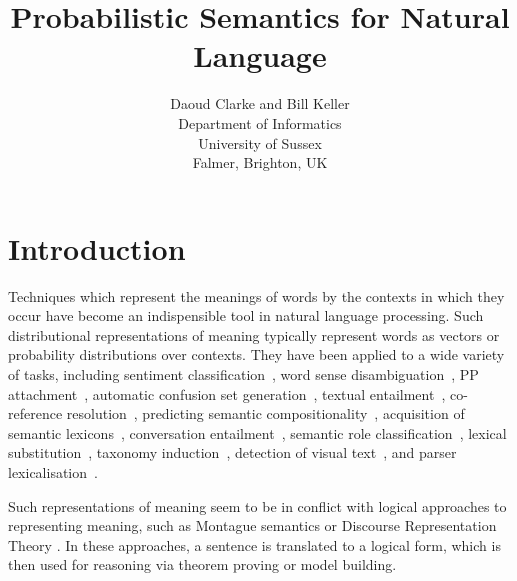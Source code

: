 \documentclass[letterpaper]{article}
\begin{document}
%
\title{Probabilistic Semantics for Natural Language}
\author{Daoud Clarke and Bill Keller\\
Department of Informatics\\
University of Sussex\\
Falmer, Brighton, UK\\
}
\maketitle



\section{Introduction}

Techniques which represent the meanings of words by the contexts in
which they occur have become an indispensible tool in natural language
processing. Such distributional representations of meaning typically
represent words as vectors or probability distributions over
contexts. They have been applied to a wide variety of tasks,
including sentiment classification~\cite{Bollegala2011}, word sense
disambiguation~\cite{miller-EtAl:2012:PAPERS,khapra-EtAl:2010:ACL}, PP
attachment~\cite{Calvo05distributionalthesaurus}, automatic confusion
set generation~\cite{xue-hwa:2012:PAPERS}, textual
entailment~\cite{berant-dagan-goldberger:2010:ACL}, co-reference
resolution~\cite{lee-EtAl:2012:EMNLP-CoNLL}, predicting semantic
compositionality~\cite{bergsma-EtAl:2010:EMNLP}, acquisition of
semantic lexicons~\cite{mcintosh:2010:EMNLP}, conversation
entailment~\cite{zhang-chai:2010:EMNLP}, semantic role
classification~\cite{zapirain-EtAl:2010:NAACLHLT}, lexical
substitution~\cite{szarvas-biemann-gurevych:2013:NAACL-HLT}, taxonomy
induction~\cite{fountain-lapata:2012:NAACL-HLT}, detection of visual
text~\cite{dodge-EtAl:2012:NAACL-HLT}, and parser
lexicalisation~\cite{rei-briscoe:2013:NAACL-HLT}.

Such representations of meaning seem to be in conflict with logical
approaches to representing meaning, such as Montague semantics or
Discourse Representation Theory \cite{Blackburn:05}. In these
approaches, a sentence is translated to a logical form, which is then
used for reasoning via theorem proving or model building.
\end{document}
